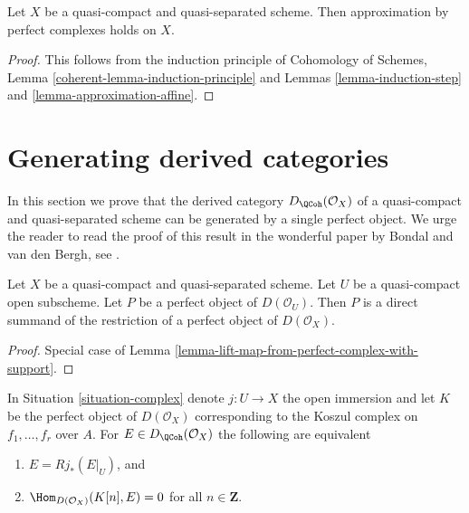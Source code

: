 \begin{theorem}
\label{theorem-approximation}
Let $X$ be a quasi-compact and quasi-separated scheme.
Then approximation by perfect complexes holds on $X$.
\end{theorem}

\begin{proof}
This follows from the induction principle of
Cohomology of Schemes, Lemma \ref{coherent-lemma-induction-principle}
and Lemmas \ref{lemma-induction-step} and \ref{lemma-approximation-affine}.
\end{proof}






\section{Generating derived categories}
\label{section-generating}

\noindent
In this section we prove that the derived category
$D_\QCoh(\mathcal{O}_X)$ of a quasi-compact
and quasi-separated scheme can be generated by a single perfect object.
We urge the reader to read the proof of this result in the wonderful paper by
Bondal and van den Bergh, see \cite{BvdB}.

\begin{lemma}
\label{lemma-direct-summand-of-a-restriction}
Let $X$ be a quasi-compact and quasi-separated scheme.
Let $U$ be a quasi-compact open subscheme.
Let $P$ be a perfect object of $D(\mathcal{O}_U)$.
Then $P$ is a direct summand of the restriction of a perfect
object of $D(\mathcal{O}_X)$.
\end{lemma}

\begin{proof}
Special case of Lemma \ref{lemma-lift-map-from-perfect-complex-with-support}.
\end{proof}

\begin{lemma}
\label{lemma-orthogonal-koszul-complex}
\begin{reference}
\cite[Proposition 6.1]{Bokstedt-Neeman}
\end{reference}
In Situation \ref{situation-complex} denote $j : U \to X$ the open
immersion and let $K$ be the perfect object of $D(\mathcal{O}_X)$
corresponding to the Koszul complex on $f_1, \ldots, f_r$ over $A$.
For $E \in D_\QCoh(\mathcal{O}_X)$ the following are equivalent
\begin{enumerate}
\item $E = Rj_*(E|_U)$, and
\item $\Hom_{D(\mathcal{O}_X)}(K[n], E) = 0$ for all $n \in \mathbf{Z}$.
\end{enumerate}
\end{lemma}

